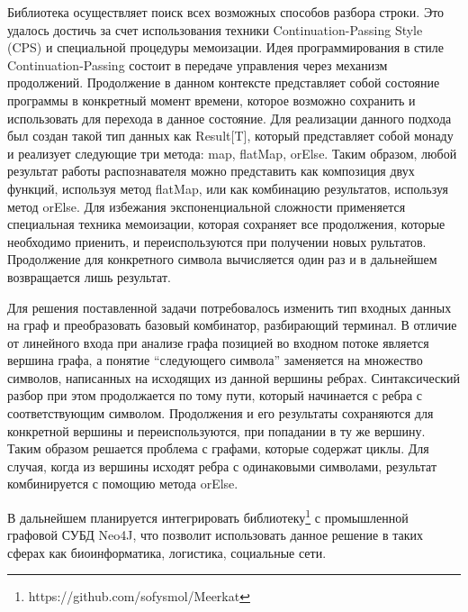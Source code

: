 \documentclass[10pt]{article}
\begin{document}
Библиотека осуществляет поиск всех возможных способов разбора строки. Это удалось достичь за счет использования техники Continuation-Passing Style (CPS) и специальной процедуры мемоизации. Идея программирования в стиле Continuation-Passing состоит в передаче управления через механизм продолжений. Продолжение в данном контексте представляет собой состояние программы в конкретный момент времени, которое возможно сохранить и использовать для перехода в данное состояние. Для реализации данного подхода был создан такой тип данных как Result[T],  который представляет собой монаду и реализует следующие три метода: map, flatMap, orElse. Таким образом, любой результат работы распознавателя можно представить как композиция двух функций, используя метод flatMap, или как комбинацию результатов, используя метод orElse. Для избежания экспоненциальной сложности применяется специальная техника мемоизации, которая сохраняет все продолжения, которые необходимо приенить, и переиспользуются при получении новых рультатов. Продолжение для конкретного символа вычисляется один раз и в дальнейшем возвращается лишь результат. 


Для решения поставленной задачи потребовалось изменить тип входных данных на граф и преобразовать базовый комбинатор, разбирающий терминал. В отличие от линейного входа при анализе графа позицией во входном потоке является вершина графа, а понятие “следующего символа” заменяется на множество символов, написанных на исходящих из данной вершины ребрах. Синтаксический разбор при этом продолжается по тому пути, который начинается с ребра с соответствующим символом. Продолжения и его результаты сохраняются для конкретной вершины и переиспользуются, при попадании в ту же вершину. Таким образом решается проблема с графами, которые содержат циклы.  Для случая, когда из вершины исходят ребра с одинаковыми символами, результат комбинируется с помощию метода orElse. 


В дальнейшем планируется интегрировать библиотеку\footnote{https://github.com/sofysmol/Meerkat} с промышленной графовой СУБД Neo4J, что позволит использовать данное решение в таких сферах как биоинформатика,  логистика, социальные сети.

\setmonofont[Mapping=tex-text]{CMU Typewriter Text}


\end{document}
